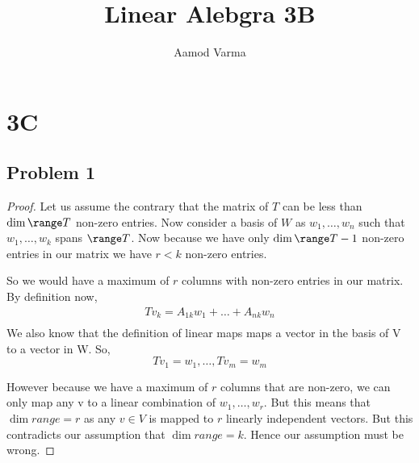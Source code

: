 \documentclass[a4paper]{report}
\title{Linear Alebgra 3B}
\author{Aamod Varma}
\begin{document}
\maketitle
\date{}

\section*{3C}
\subsection*{Problem 1}
\begin{proof}
    Let us assume the contrary that the matrix of $T$ can be less than $\dim \range T$ non-zero entries. Now consider a basis of $W$ as $w_1,\dots,w_n$ such that $w_1,\dots,w_k$ spans $\range T$. Now because we have only $\dim \range T - 1$ non-zero entries in our matrix we have $r < k$ non-zero entries.

    So we would have a maximum of $r$ columns with non-zero entries in our matrix. By definition now, 
    \begin{align*}
        Tv_k = A_{1k}w_1 + \dots + A_{nk}w_n\\
    \end{align*}
    We also know that the definition of linear maps maps a vector in the basis of V to a vector in W. So,
    $$ Tv_1 = w_1 ,\dots,Tv_m = w_m$$ 

    However because we have a maximum of $r$ columns that are non-zero, we can only map  any v to a linear combination of $w_1,\dots,w_r$. But this means that $\dim range = r$ as any $v \in V$ is mapped to $r$ linearly independent vectors. But this contradicts our assumption that $\dim range = k$. Hence our assumption must be wrong.
\end{proof}
\end{document}
